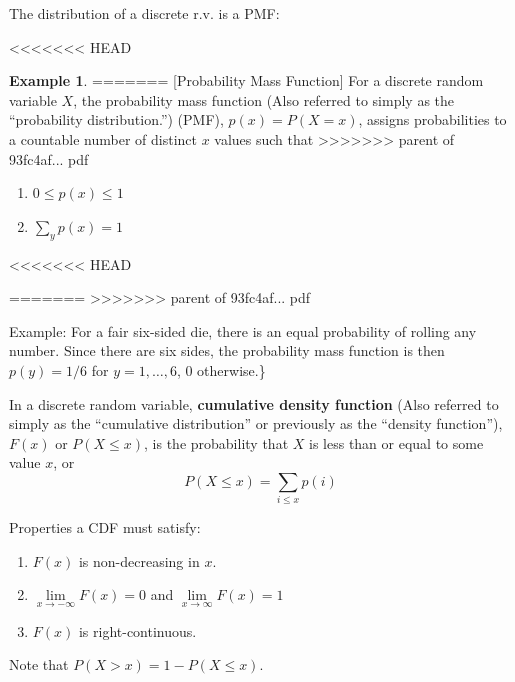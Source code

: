 \documentclass[]{book}
\providecommand{\tightlist}{%
  \setlength{\itemsep}{0pt}\setlength{\parskip}{0pt}}
\theoremstyle{definition}
\theoremstyle{definition}
\newtheorem{example}{Example}[chapter]
\theoremstyle{definition}
\theoremstyle{remark}
\begin{document}
The distribution of a discrete r.v. is a PMF:

<<<<<<< HEAD
\begin{example}
\protect\hypertarget{exm:matrixmulti}{}{\label{exm:matrixmulti} }
=======
[Probability Mass Function]
\protect\hypertarget{def:unnamed-chunk-76}{}{\label{def:unnamed-chunk-76} {} }
For a discrete random variable \(X\), the probability mass function (Also referred to simply as the ``probability distribution.'') (PMF), \(p(x)=P(X=x)\), assigns probabilities to a countable number of distinct \(x\) values such that
>>>>>>> parent of 93fc4af... pdf

\begin{enumerate}
\def\labelenumi{\arabic{enumi}.}
\tightlist
\item
  \(0\le p(x)\le 1\)
\item
  \(\sum\limits_y p(x)=1\)
\end{enumerate}
<<<<<<< HEAD
\end{example}
=======
>>>>>>> parent of 93fc4af... pdf

Example: For a fair six-sided die, there is an equal probability of rolling any number. Since there are six sides, the probability mass function is then \(p(y)=1/6\) for \(y=1,\ldots,6\), 0 otherwise.\}

In a discrete random variable, \textbf{cumulative density function} (Also referred to simply as the ``cumulative distribution'' or previously as the ``density function''), \(F(x)\) or \(P(X\le x)\), is the probability that \(X\) is less than or equal to some value \(x\), or \[P(X\le x)=\sum\limits_{i\le x} p(i)\]

Properties a CDF must satisfy:

\begin{enumerate}
\def\labelenumi{\arabic{enumi}.}
\tightlist
\item
  \(F(x)\) is non-decreasing in \(x\).
\item
  \(\lim\limits_{x \to -\infty} F(x) = 0\) and \(\lim\limits_{x \to \infty} F(x) = 1\)
\item
  \(F(x)\) is right-continuous.
\end{enumerate}

Note that \(P(X > x) = 1 - P(X \le x)\).
\end{document}
